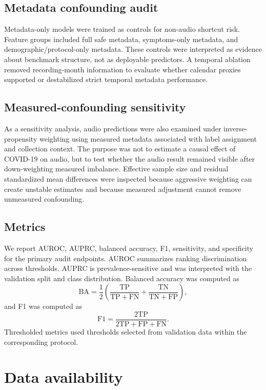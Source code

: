 \documentclass[11pt]{article}
\begin{document}
\subsection*{Metadata confounding audit}

Metadata-only models were trained as controls for non-audio shortcut risk. Feature groups included full safe metadata, symptoms-only metadata, and demographic/protocol-only metadata. These controls were interpreted as evidence about benchmark structure, not as deployable predictors. A temporal ablation removed recording-month information to evaluate whether calendar proxies supported or destabilized strict temporal metadata performance.

\subsection*{Measured-confounding sensitivity}

As a sensitivity analysis, audio predictions were also examined under inverse-propensity weighting using measured metadata associated with label assignment and collection context. The purpose was not to estimate a causal effect of COVID-19 on audio, but to test whether the audio result remained visible after down-weighting measured imbalance. Effective sample size and residual standardized mean differences were inspected because aggressive weighting can create unstable estimates and because measured adjustment cannot remove unmeasured confounding.

\subsection*{Metrics}

We report AUROC, AUPRC, balanced accuracy, F1, sensitivity, and specificity for the primary audit endpoints. AUROC summarizes ranking discrimination across thresholds. AUPRC is prevalence-sensitive and was interpreted with the validation split and class distribution. Balanced accuracy was computed as
\[
\mathrm{BA}=\frac{1}{2}\left(\frac{\mathrm{TP}}{\mathrm{TP}+\mathrm{FN}}+\frac{\mathrm{TN}}{\mathrm{TN}+\mathrm{FP}}\right),
\]
and F1 was computed as
\[
\mathrm{F1}=\frac{2\mathrm{TP}}{2\mathrm{TP}+\mathrm{FP}+\mathrm{FN}}.
\]
Thresholded metrics used thresholds selected from validation data within the corresponding protocol.

\section*{Data availability}
\end{document}
